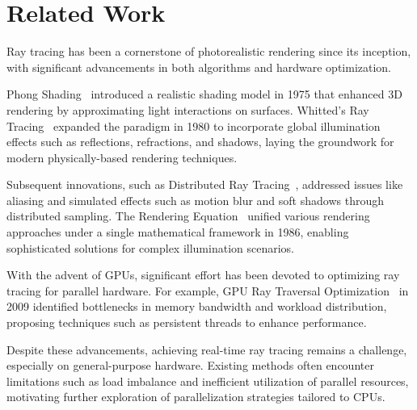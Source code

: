 \section{Related Work}
\label{sec:related-work}
Ray tracing has been a cornerstone of photorealistic rendering since its inception, with significant advancements in both algorithms and hardware optimization.

Phong Shading~\cite{Phong1975} introduced a realistic shading model in 1975 that enhanced 3D rendering by approximating light interactions on surfaces. Whitted's Ray Tracing~\cite{Whitted1980} expanded the paradigm in 1980 to incorporate global illumination effects such as reflections, refractions, and shadows, laying the groundwork for modern physically-based rendering techniques.

Subsequent innovations, such as Distributed Ray Tracing~\cite{Cook1984}, addressed issues like aliasing and simulated effects such as motion blur and soft shadows through distributed sampling. The Rendering Equation~\cite{Kajiya1986} unified various rendering approaches under a single mathematical framework in 1986, enabling sophisticated solutions for complex illumination scenarios.

With the advent of GPUs, significant effort has been devoted to optimizing ray tracing for parallel hardware. For example, GPU Ray Traversal Optimization~\cite{Aila2009} in 2009 identified bottlenecks in memory bandwidth and workload distribution, proposing techniques such as persistent threads to enhance performance.

Despite these advancements, achieving real-time ray tracing remains a challenge, especially on general-purpose hardware. Existing methods often encounter limitations such as load imbalance and inefficient utilization of parallel resources, motivating further exploration of parallelization strategies tailored to CPUs.
